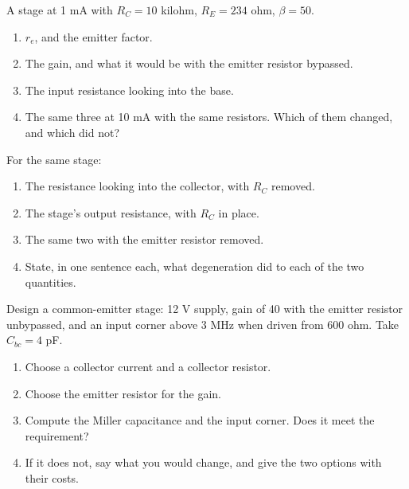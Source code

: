 \label{c7:ex:3}
A stage at 1 mA with $R_C = 10$ kilohm, $R_E = 234$ ohm, $\beta = 50$.

\begin{enumerate}
  \item $r_e$, and the emitter factor.
  \item The gain, and what it would be with the emitter resistor bypassed.
  \item The input resistance looking into the base.
  \item The same three at 10 mA with the same resistors. Which of them changed, and which did not?
\end{enumerate}

\label{c7:ex:4}
For the same stage:

\begin{enumerate}
  \item The resistance looking into the collector, with $R_C$ removed.
  \item The stage's output resistance, with $R_C$ in place.
  \item The same two with the emitter resistor removed.
  \item State, in one sentence each, what degeneration did to each of the two quantities.
\end{enumerate}

\label{c7:ex:5}
Design a common-emitter stage: 12 V supply, gain of 40 with the emitter resistor unbypassed, and an input corner above 3 MHz when driven from 600 ohm. Take $C_{bc} = 4$ pF.

\begin{enumerate}
  \item Choose a collector current and a collector resistor.
  \item Choose the emitter resistor for the gain.
  \item Compute the Miller capacitance and the input corner. Does it meet the requirement?
  \item If it does not, say what you would change, and give the two options with their costs.
\end{enumerate}

